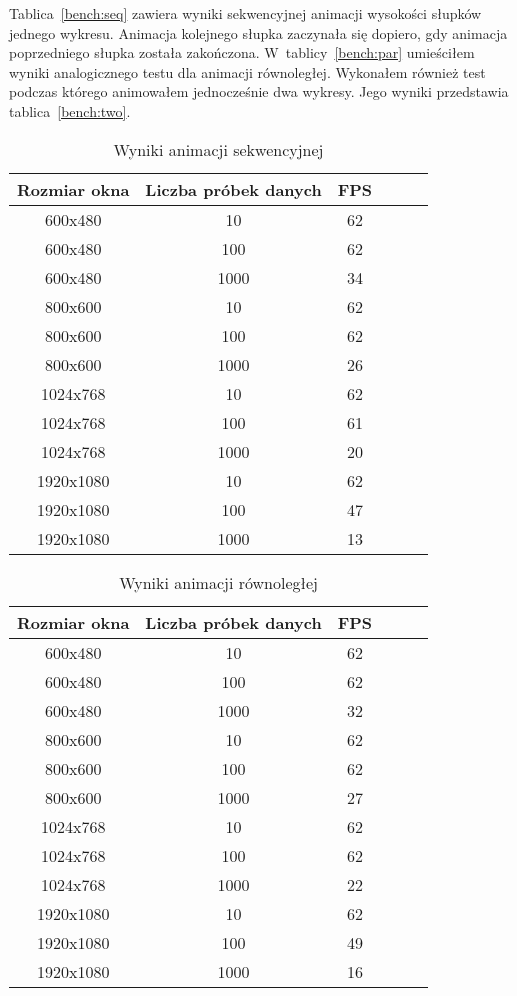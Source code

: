 Tablica~\ref{bench:seq} zawiera wyniki sekwencyjnej animacji wysokości słupków jednego wykresu. Animacja kolejnego słupka zaczynała się dopiero, gdy animacja poprzedniego słupka została zakończona. W~tablicy~\ref{bench:par} umieściłem wyniki analogicznego testu dla animacji równoległej. Wykonałem również test podczas którego animowałem jednocześnie dwa wykresy. Jego wyniki przedstawia tablica~\ref{bench:two}.

\begin{table}\footnotesize
\centering
\caption{Wyniki animacji sekwencyjnej}\label{bench:seq}
\label{tab:wykresy}
\begin{tabular}{|c|c|c|c|c|c|}
\hline
Rozmiar okna & Liczba próbek danych & FPS\\
\hline
600x480 & 10 & 62\\
\hline
600x480 & 100 & 62\\
\hline
600x480 & 1000 & 34\\
\hline
800x600 & 10 & 62\\
\hline
800x600 & 100 & 62\\
\hline
800x600 & 1000 & 26\\
\hline
1024x768 & 10 & 62\\
\hline
1024x768 & 100 & 61\\
\hline
1024x768 & 1000 & 20\\
\hline
1920x1080 & 10 & 62\\
\hline
1920x1080 & 100 & 47\\
\hline
1920x1080 & 1000 & 13\\
\hline
\end{tabular}
\end{table}

\begin{table}\footnotesize
\centering
\caption{Wyniki animacji równoległej}\label{bench:par}
\label{tab:wykresy}
\begin{tabular}{|c|c|c|c|c|c|}
\hline
Rozmiar okna & Liczba próbek danych & FPS\\
\hline
600x480 & 10 & 62\\
\hline
600x480 & 100 & 62\\
\hline
600x480 & 1000 & 32\\
\hline
800x600 & 10 & 62\\
\hline
800x600 & 100 & 62\\
\hline
800x600 & 1000 & 27\\
\hline
1024x768 & 10 & 62\\
\hline
1024x768 & 100 & 62\\
\hline
1024x768 & 1000 & 22\\
\hline
1920x1080 & 10 & 62\\
\hline
1920x1080 & 100 & 49\\
\hline
1920x1080 & 1000 & 16\\
\hline
\end{tabular}
\end{table}

